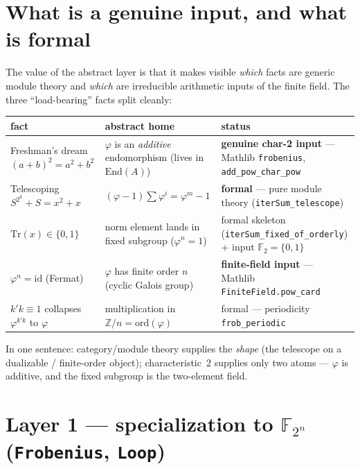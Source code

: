 \documentclass[11pt]{article}
\newcommand{\lc}[1]{\texttt{\small #1}}
\newcommand{\phiop}{\varphi}
\begin{document}
\section{What is a genuine input, and what is formal}

The value of the abstract layer is that it makes visible \emph{which} facts are
generic module theory and \emph{which} are irreducible arithmetic inputs of the
finite field. The three ``load-bearing'' facts split cleanly:

\begin{center}\small
\renewcommand{\arraystretch}{1.35}
\begin{tabular}{@{}p{4.4cm} p{5.1cm} p{5.6cm}@{}}
\textbf{fact} & \textbf{abstract home} & \textbf{status}\\ \hline
Freshman's dream $(a{+}b)^2=a^2{+}b^2$
  & $\phiop$ is an \emph{additive} endomorphism (lives in $\mathrm{End}(A)$)
  & {\color{inp}\textbf{genuine char-2 input}} --- Mathlib \lc{frobenius}, \lc{add\_pow\_char\_pow}\\
Telescoping $S^{2^k}{+}S=x^2{+}x$
  & $(\phiop{-}1)\sum\phiop^i=\phiop^m{-}1$
  & {\color{gen}\textbf{formal}} --- pure module theory (\lc{iterSum\_telescope})\\
$\mathrm{Tr}(x)\in\{0,1\}$
  & norm element lands in fixed subgroup ($\phiop^n{=}1$)
  & {\color{gen}formal skeleton} (\lc{iterSum\_fixed\_of\_orderly}) + {\color{inp}input} $\mathbb{F}_2=\{0,1\}$\\
$\phiop^n=\mathrm{id}$ (Fermat)
  & $\phiop$ has finite order $n$ (cyclic Galois group)
  & {\color{inp}\textbf{finite-field input}} --- Mathlib \lc{FiniteField.pow\_card}\\
$k'k\equiv1$ collapses $\phiop^{k'k}$ to $\phiop$
  & multiplication in $\mathbb{Z}/n=\mathrm{ord}(\phiop)$
  & {\color{gen}formal} --- periodicity \lc{frob\_periodic}\\
\end{tabular}
\end{center}

\noindent In one sentence: category/module theory supplies the \emph{shape} (the
telescope on a dualizable / finite-order object); characteristic~2 supplies only
two atoms --- $\phiop$ is additive, and the fixed subgroup is the two-element field.

\section{Layer 1 --- specialization to $\mathbb{F}_{2^n}$ (\texttt{Frobenius}, \texttt{Loop})}
\end{document}

